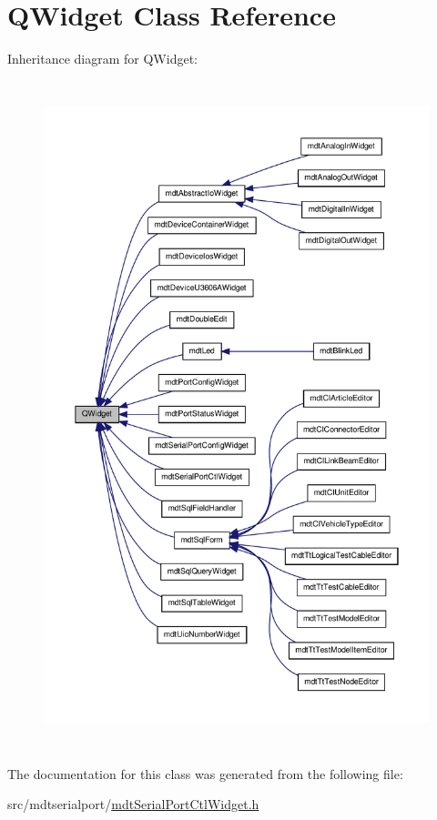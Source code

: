 \hypertarget{class_q_widget}{\section{Q\-Widget Class Reference}
\label{class_q_widget}
}


Inheritance diagram for Q\-Widget\-:\nopagebreak
\begin{figure}[H]
\begin{center}
\leavevmode
\includegraphics[height=550pt]{class_q_widget__inherit__graph}
\end{center}
\end{figure}


The documentation for this class was generated from the following file\-:\begin{DoxyCompactItemize}
\item 
src/mdtserialport/\hyperlink{mdt_serial_port_ctl_widget_8h}{mdt\-Serial\-Port\-Ctl\-Widget.\-h}\end{DoxyCompactItemize}
